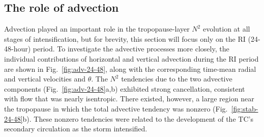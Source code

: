   \subsection{The role of advection}

Advection played an important role in the tropopause-layer $N^2$ evolution at all stages of intensification, but for brevity, this section will focus only on the RI (24-48-hour) period.
To investigate the advective processes more closely, the individual contributions of horizontal and vertical advection during the RI period are shown in Fig.~\ref{fig:adv-24-48}, along with the corresponding time-mean radial and vertical velocities and $\theta$.
The $N^2$ tendencies due to the two advective components (Fig.~\ref{fig:adv-24-48}a,b) exhibited strong cancellation, consistent with flow that was nearly isentropic.
There existed, however, a large region near the tropopause in which the total advective tendency was nonzero (Fig.~\ref{fig:stab-24-48}b).
These nonzero tendencies were related to the development of the TC's secondary circulation as the storm intensified.





